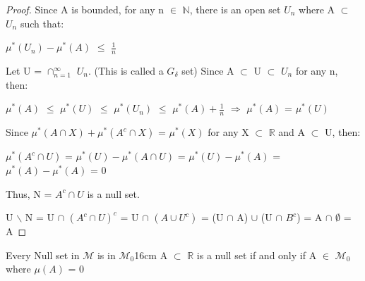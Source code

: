     \begin{proof}
        Since A is bounded, for any n $\in$ $\mathbb{N}$,
        there is an open set $U_n$ where A $\subset$ $U_n$ such that:
        
        \hspace{0.5cm}
        $\mu^*(U_n) - \mu^*(A)$ $\leq$ $\frac{1}{n}$

        Let U = $\cap_{n=1}^{\infty}$ $U_n$.
        (This is called a {\color{lblue} $G_{\delta}$ set})
        Since A $\subset$ U $\subset$ $U_n$ for any n, then:

        \hspace{0.5cm}
        $\mu^*(A)$
        $\leq$ $\mu^*(U)$
        $\leq$ $\mu^*(U_n)$
        $\leq$ $\mu^*(A) + \frac{1}{n}$
        \hspace{0.5cm}
        $\Rightarrow$
        \hspace{0.5cm}
        $\mu^*(A)$ = $\mu^*(U)$

        Since $\mu^*(A \cap X) + \mu^*(A^c \cap X)$ = $\mu^*(X)$ for any X
        $\subset$ $\mathbb{R}$ and A $\subset$ U, then:

        \hspace{0.5cm}
        $\mu^*(A^c \cap U)$
        = $\mu^*(U) - \mu^*(A \cap U)$
        = $\mu^*(U) - \mu^*(A)$
        = $\mu^*(A) - \mu^*(A)$
        = 0

        Thus, N = $A^c \cap U$ is a null set.
        
        \hspace{0.5cm}
        U $\backslash$ N
        = U $\cap$ $(A^c \cap U)^c$
        = U $\cap$ $(A \cup U^c)$
        = (U $\cap$ A) $\cup$ (U $\cap$ $B^c$)
        = A $\cap$ $\emptyset$
        = A
    \end{proof}

    \vspace{0.5cm}



    \begin{wtheorem}{Every Null set in $\mathcal{M}$ is in $\mathcal{M}_0$}{16cm}
        A $\subset$ $\mathbb{R}$ is a null set if and only if
        A $\in$ $\mathcal{M}_0$ where $\mu(A)$ = 0 
    \end{wtheorem}

